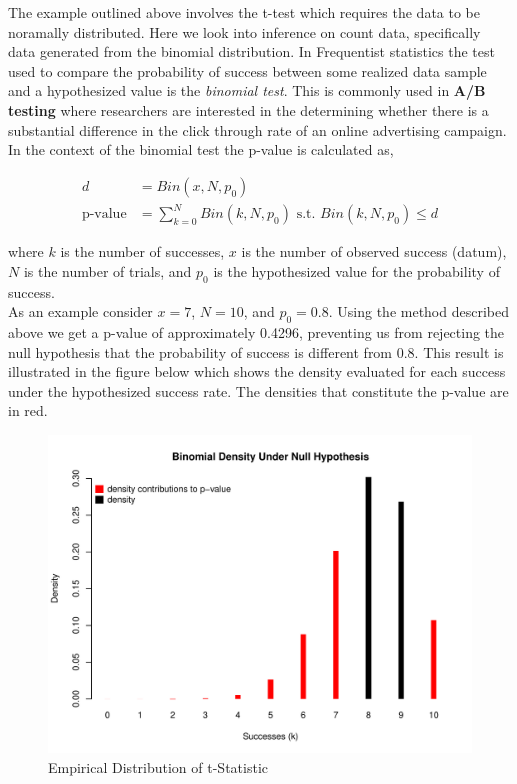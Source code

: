 \documentclass[12pt]{article}
\begin{document}
The example outlined above involves the t-test which requires the data to be noramally distributed. Here we look into inference on count data, specifically data generated from the binomial distribution. In Frequentist statistics the test used to compare the probability of success between some realized data sample and a hypothesized value is the \emph{binomial test}. This is commonly used in \textbf{A/B testing} where researchers are interested in the determining whether there is a substantial difference in the click through rate of an online advertising campaign. \\

\noindent In the context of the binomial test the p-value is calculated as,

\begin{align*}
d &= Bin(x, N, p_0) \\
\mbox{p-value} &= \sum_{k=0}^{N}Bin(k, N, p_0) \mbox{ s.t. } Bin(k, N, p_0) \leq d
\end{align*}

\noindent where $k$ is the number of successes, $x$ is the number of observed success (datum), $N$ is the number of trials, and $p_0$ is the hypothesized value for the probability of success. \\

\noindent As an example consider $x = 7$, $N = 10$, and $p_0 = 0.8$. Using the method described above we get a p-value of approximately 0.4296, preventing us from rejecting the null hypothesis that the probability of success is different from 0.8. This result is illustrated in the figure below which shows the density evaluated for each success under the hypothesized success rate. The densities that constitute the p-value are in red.

\begin{figure}[H]\caption[]{Empirical Distribution of t-Statistic}
\centering
\begin{minipage}{0.6\linewidth}
\includegraphics[trim={0cm 0cm 0cm 1.5cm}, clip, scale=0.6]{../figs/bintest_dist.pdf}
\end{minipage}
\end{figure}
\end{document}
